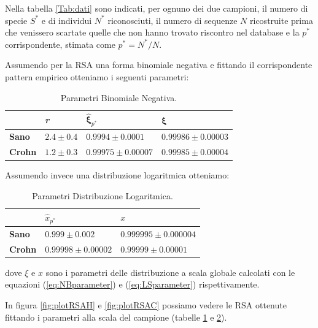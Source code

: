 Nella tabella \ref{Tab:dati} sono indicati, per ognuno dei due campioni, il numero di specie $S^*$ e di individui $N^*$ riconosciuti, il numero di sequenze $N$ ricostruite prima che venissero scartate quelle che non hanno trovato riscontro nel database e la $p^*$ corrispondente, stimata come $p^*=N^*/N$.


Assumendo per la RSA una forma binomiale negativa e fittando il corrispondente pattern empirico otteniamo i seguenti parametri:


\begin{table}[H]
\centering
\begin{tabular}{l|l|l|l|}
\cline{2-4}
                                     & \textit{r}    & $\mathbf{\hat \xi}_{p^*}$                & $\mathbf{\xi}$             \\ \hline
\multicolumn{1}{|l|}{\textbf{Sano}}  & $2.4 \pm 0.4$ & $0.9994 \pm 0.0001$ & $0.99986 \pm0.00003 $ \\ \hline
\multicolumn{1}{|l|}{\textbf{Crohn}} & $1.2 \pm 0.3$ & $0.99975 \pm0.00007 $     & $0.99985 \pm0.00004 $ \\ \hline
\end{tabular}
\caption{Parametri Binomiale Negativa.}
\label{Tab:parametriNB}
\end{table}

Assumendo invece una distribuzione logaritmica otteniamo:

\begin{table}[H]
\centering
\begin{tabular}{l|l|l|}
\cline{2-3}
                                     & $\hat x_{p^*}$                    & $x$ \\ \hline
\multicolumn{1}{|l|}{\textbf{Sano}}  & $0.999 \pm 0.002$     & $ 0.999995 \pm 0.000004$ \\ \hline
\multicolumn{1}{|l|}{\textbf{Crohn}} & $0.99998 \pm 0.00002$ & $ 0.99999 \pm0.00001$  \\ \hline
\end{tabular}
\caption{Parametri Distribuzione Logaritmica.}
\label{Tab:parametriLS}
\end{table}

dove $\xi$ e $x$ sono i parametri delle distribuzione a scala globale calcolati con le equazioni (\ref{eq:NBparameter}) e (\ref{eq:LSparameter}) rispettivamente.

In figura \ref{fig:plotRSAH} e \ref{fig:plotRSAC} possiamo vedere le RSA ottenute fittando i parametri alla scala del campione (tabelle \ref{Tab:parametriNB} e \ref{Tab:parametriLS}).

